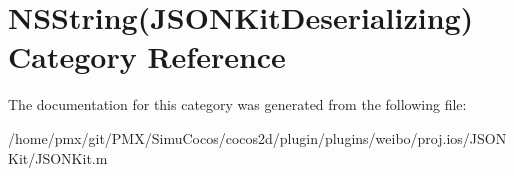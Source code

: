 \hypertarget{categoryNSString_07JSONKitDeserializing_08}{}\section{N\+S\+String(J\+S\+O\+N\+Kit\+Deserializing) Category Reference}
\label{categoryNSString_07JSONKitDeserializing_08}


The documentation for this category was generated from the following file\+:\begin{DoxyCompactItemize}
\item 
/home/pmx/git/\+P\+M\+X/\+Simu\+Cocos/cocos2d/plugin/plugins/weibo/proj.\+ios/\+J\+S\+O\+N\+Kit/J\+S\+O\+N\+Kit.\+m\end{DoxyCompactItemize}
